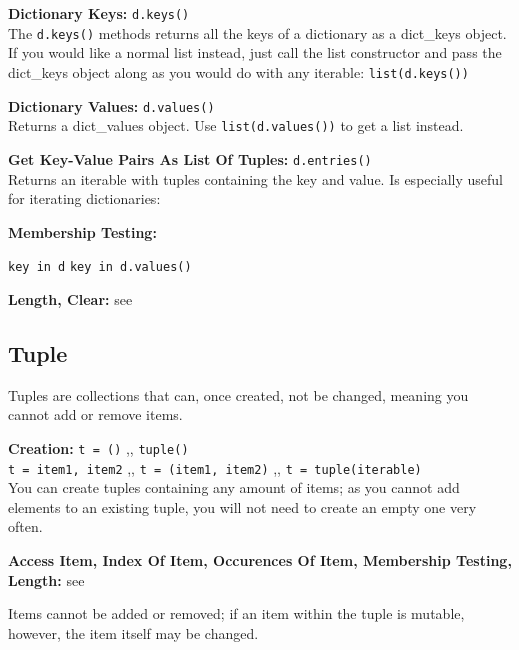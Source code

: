 \begin{indentblock}
            \textbf{Dictionary Keys:} \texttt{d.keys()} \\
            The \texttt{d.keys()} methods returns all the keys of a dictionary as a
            dict\_keys
            object. If you would like a normal list instead, just call the list constructor and pass
            the dict\_keys object along as you would do with any iterable:
            \texttt{list(d.keys())}

            \textbf{Dictionary Values:} \texttt{d.values()} \\
            Returns a dict\_values object. Use \texttt{list(d.values())} to get a list
            instead.

            \textbf{Get Key-Value Pairs As List Of Tuples:} \texttt{d.entries()} \\
            Returns an iterable with tuples containing the key and value.
            Is especially useful for iterating dictionaries:


            \textbf{Membership Testing:}
            \begin{itemize}
                 \texttt{key in d}
                 \texttt{key in d.values()}
            \end{itemize}

            \textbf{Length, Clear:} see 

        \end{indentblock}


    \subsection{Tuple}

        Tuples are collections that can, once created, not be changed, meaning you
        cannot add or remove items.

        \begin{indentblock}

            \textbf{Creation:} \texttt{t = ()} \sep{,} \texttt{tuple()} \\
            \texttt{t = item1, item2} \sep{,}
            \texttt{t = (item1, item2)} \sep{,}
            \texttt{t = tuple(iterable)} \\
            You can create tuples containing any amount of items; as you cannot add elements to an
            existing tuple, you will not need to create an empty one very often.

            \textbf{Access Item, Index Of Item, Occurences Of Item, Membership Testing, Length:}
            see 

            Items cannot be added or removed; if an item within the tuple is mutable, however,
            the item itself may be changed.

        \end{indentblock}

